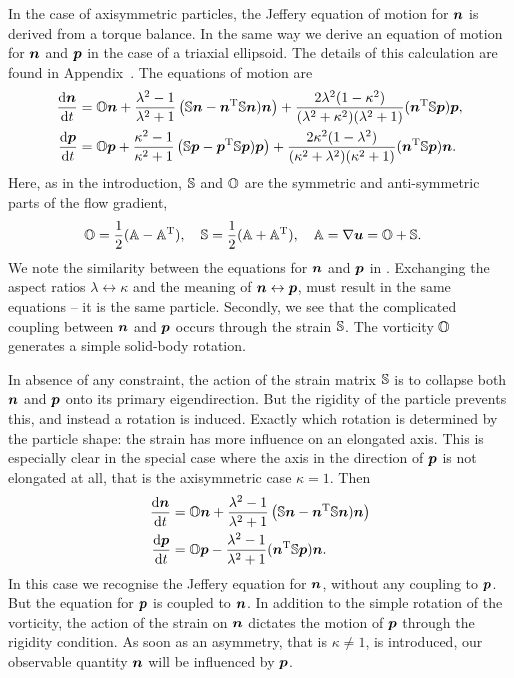\documentclass[thesis.tex]{subfiles}
\begin{document}
In the case of axisymmetric particles, the Jeffery equation of motion for $\mbox{\boldmath$n$}$ is derived from a torque balance. In the same way we derive an equation of motion for $\mbox{\boldmath$n$}$ and $\mbox{\boldmath$p$}$ in the case of a triaxial ellipsoid. The details of this calculation are found in Appendix~. The equations of motion are
\begin{align}
	\diff{\ve{n}}{t} &= \ma O \ve{n} + \frac{\lambda^2-1}{\lambda^2+1} \left(\ma S \ve n- \ve{n}\transpose \ma S \ve{n})\ve{n}\right) + \frac{ 2\lambda^2 (1 - \kappa^2) }{(\lambda^2+\kappa^2)(\lambda^2+1)}(\ve{n}\transpose \ma S \ve{p})\ve{p}, \nn\\
	\diff{\ve{p}}{t} &= \ma O \ve{p} + \frac{\kappa^2-1}{\kappa^2+1}\left(\ma S \ve p - \ve{p}\transpose \ma S \ve{p})\ve{p}\right) + \frac{ 2\kappa^2 (1 - \lambda^2) }{(\kappa^2+\lambda^2)(\kappa^2+1)}(\ve{n}\transpose \ma S \ve{p})\ve{n}.\eqnlab{triaxial_equation}
\end{align}
Here, as in the introduction, $\mathbb{S}$ and $\mathbb{O}$ are the symmetric and anti-symmetric parts of the flow gradient,
\begin{align*}
	&\mathbb{O} = \frac{1}{2}(\mathbb{A} - \mathbb{A}^{\mathrm T}),\quad
	\mathbb{S} = \frac{1}{2}(\mathbb{A} + \mathbb{A}^{\mathrm T}),\quad
	\mathbb{A} = \nabla \mbox{\boldmath$u$} = \mathbb{O} + \mathbb{S}.
\end{align*}
We note the similarity between the equations for $\mbox{\boldmath$n$}$ and $\mbox{\boldmath$p$}$ in . Exchanging the aspect ratios $\lambda \leftrightarrow \kappa$ and the meaning of $\mbox{\boldmath$n$} \leftrightarrow \mbox{\boldmath$p$}$, must result in the same equations -- it is the same particle. Secondly, we see that the complicated coupling between $\mbox{\boldmath$n$}$ and $\mbox{\boldmath$p$}$ occurs through the strain $\mathbb{S}$. The vorticity $\mathbb{O}$ generates a simple solid-body rotation.

In absence of any constraint, the action of the strain matrix $\mathbb{S}$ is to collapse both $\mbox{\boldmath$n$}$ and $\mbox{\boldmath$p$}$ onto its primary eigendirection. But the rigidity of the particle prevents this, and instead a rotation is induced. Exactly which rotation is determined by the particle shape: the strain has more influence on an elongated axis. This is especially clear in the special case where the axis in the direction of $\mbox{\boldmath$p$}$ is not elongated at all, that is the axisymmetric case $\kappa = 1$. Then
\begin{align}
	\diff{\ve{n}}{t} &= \ma O \ve{n} + \frac{\lambda^2-1}{\lambda^2+1} \left(\ma S \ve n- \ve{n}\transpose \ma S \ve{n})\ve{n}\right) \nn\\
	\diff{\ve{p}}{t} &= \ma O \ve{p} - \frac{   \lambda^2-1 }{\lambda^2+1}(\ve{n}\transpose \ma S \ve{p})\ve{n}.\eqnlab{triaxial_equation_symm}
\end{align}
In this case we recognise the Jeffery equation for $\mbox{\boldmath$n$}$, without any coupling to $\mbox{\boldmath$p$}$. But the equation for $\mbox{\boldmath$p$}$ is coupled to $\mbox{\boldmath$n$}$.  In addition to the simple rotation of the vorticity, the action of the strain on $\mbox{\boldmath$n$}$ dictates the motion of $\mbox{\boldmath$p$}$ through the rigidity condition. As soon as an asymmetry, that is $\kappa \neq 1$, is introduced, our observable quantity $\mbox{\boldmath$n$}$ will be influenced by $\mbox{\boldmath$p$}$.
\end{document}
